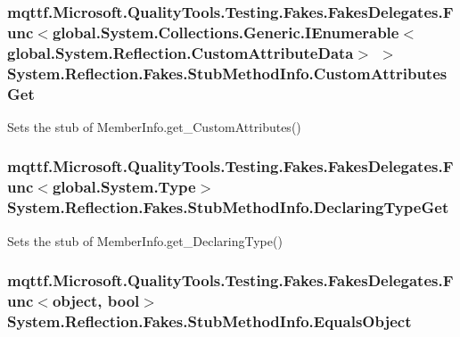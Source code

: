 \hypertarget{class_system_1_1_reflection_1_1_fakes_1_1_stub_method_info_aa03074a6b3f656450ad1012c5b9c5094}{
\subsubsection[{Custom\-Attributes\-Get}]{\setlength{\rightskip}{0pt plus 5cm}mqttf.\-Microsoft.\-Quality\-Tools.\-Testing.\-Fakes.\-Fakes\-Delegates.\-Func$<$global.\-System.\-Collections.\-Generic.\-I\-Enumerable$<$global.\-System.\-Reflection.\-Custom\-Attribute\-Data$>$ $>$ System.\-Reflection.\-Fakes.\-Stub\-Method\-Info.\-Custom\-Attributes\-Get}}\label{class_system_1_1_reflection_1_1_fakes_1_1_stub_method_info_aa03074a6b3f656450ad1012c5b9c5094}


Sets the stub of Member\-Info.\-get\-\_\-\-Custom\-Attributes()

\hypertarget{class_system_1_1_reflection_1_1_fakes_1_1_stub_method_info_ab68ab1f424a03a11087ad2d1489f331f}{
\subsubsection[{Declaring\-Type\-Get}]{\setlength{\rightskip}{0pt plus 5cm}mqttf.\-Microsoft.\-Quality\-Tools.\-Testing.\-Fakes.\-Fakes\-Delegates.\-Func$<$global.\-System.\-Type$>$ System.\-Reflection.\-Fakes.\-Stub\-Method\-Info.\-Declaring\-Type\-Get}}\label{class_system_1_1_reflection_1_1_fakes_1_1_stub_method_info_ab68ab1f424a03a11087ad2d1489f331f}


Sets the stub of Member\-Info.\-get\-\_\-\-Declaring\-Type()

\hypertarget{class_system_1_1_reflection_1_1_fakes_1_1_stub_method_info_a7f042c4aab65ef9ae1822fc14d143f81}{
\subsubsection[{Equals\-Object}]{\setlength{\rightskip}{0pt plus 5cm}mqttf.\-Microsoft.\-Quality\-Tools.\-Testing.\-Fakes.\-Fakes\-Delegates.\-Func$<$object, bool$>$ System.\-Reflection.\-Fakes.\-Stub\-Method\-Info.\-Equals\-Object}}\label{class_system_1_1_reflection_1_1_fakes_1_1_stub_method_info_a7f042c4aab65ef9ae1822fc14d143f81}


